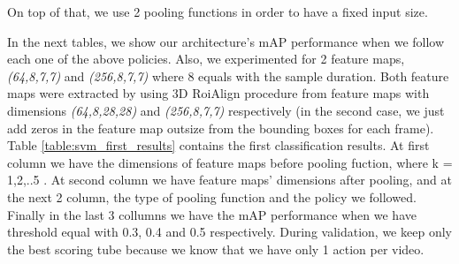 \documentclass{report}
\begin{document}
On top of that, we use 2 pooling functions in order to have a fixed input size. \par
In the next tables, we show our architecture's  mAP performance when we follow each one of the above policies. Also,
we experimented for 2 feature maps, \textit{(64,8,7,7)} and \textit{(256,8,7,7)} where 8 equals with the sample duration.
Both feature maps were extracted by using 3D RoiAlign procedure from feature maps with dimensions \textit{(64,8,28,28)} and
\textit{(256,8,7,7)} respectively (in the second case, we just add zeros in the feature map outsize from the bounding boxes for
each frame). Table \ref{table:svm_first_results} contains the first classification results. At first column we have the dimensions
of feature maps before pooling fuction, where k = 1,2,..5 . At second column we have feature maps' dimensions after pooling, and at
the next 2 column, the type of pooling function and the policy we followed. Finally in the last 3 collumns we have the mAP performance
when we have threshold equal with 0.3, 0.4 and 0.5 respectively. During validation, we keep only the best scoring tube because we know that
we have only 1 action per video.
\end{document}

